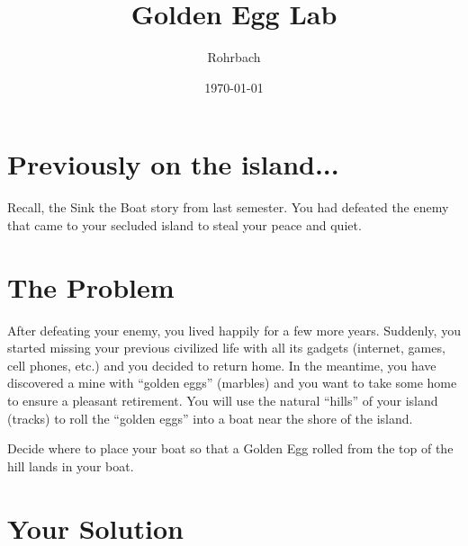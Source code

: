 \documentclass[10pt]{exam}
\title{Golden Egg Lab}
\author{Rohrbach}
\date{\today}
\begin{document}
\maketitle



\section*{Previously on the island...}

Recall, the Sink the Boat story from last semester.  You had defeated the enemy that came to your secluded island to steal your peace and quiet.


\section*{The Problem}

After defeating your enemy, you lived happily for a few more years. Suddenly, you started missing your previous civilized life with all its gadgets (internet, games, cell phones, etc.) and you decided to return home. In the meantime, you have discovered a mine with ``golden eggs'' (marbles) and you want to take some home to ensure a pleasant retirement. You will use the natural ``hills'' of your island (tracks) to roll the ``golden eggs'' into a boat near the shore of the island. 

\vspace{2em}


\vspace{2em}

\noindent
Decide where to place your boat so that a Golden Egg rolled from the top of the hill lands in your boat.


\section*{Your Solution}
\end{document}
